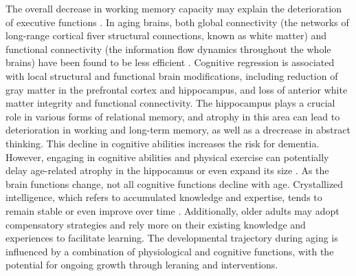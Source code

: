 

	
The overall decrease in working memory capacity may explain the deterioration of executive functions \cite{Zinke2014}. In aging brains, both global connectivity (the networks of long-range cortical fiver structural connections, known as white matter) and functional connectivity (the information flow dynamics throughout the whole brains) have been found to be less efficient \cite{Spreng2013}. Cognitive regression is associated with local structural and functional brain modifications, including reduction of gray matter in the prefrontal cortex and hippocampus, and loss of anterior white matter integrity and functional connectivity. The hippocampus plays a crucial role in various forms of relational memory, and atrophy in this area can lead to deterioration in working and long-term memory, as well as a drecrease in abstract thinking. This decline in cognitive abilities increases the risk for dementia. However, engaging in cognitive abilities and physical exercise can potentially delay age-related atrophy in the hippocamus or even expand its size \cite{Erickson2011, Fotuhi2012}. 
As the brain functions change, not all cognitive functions decline with age. Crystallized intelligence, which refers to accumulated knowledge and expertise, tends to remain stable or even improve over time \cite{Stemmler2013}. Additionally, older adults may adopt compensatory strategies and rely more on their existing knowledge and experiences to facilitate learning. The developmental trajectory during aging is influenced by a combination of physiological and cognitive functions, with the potential for ongoing growth through leraning and interventions.


